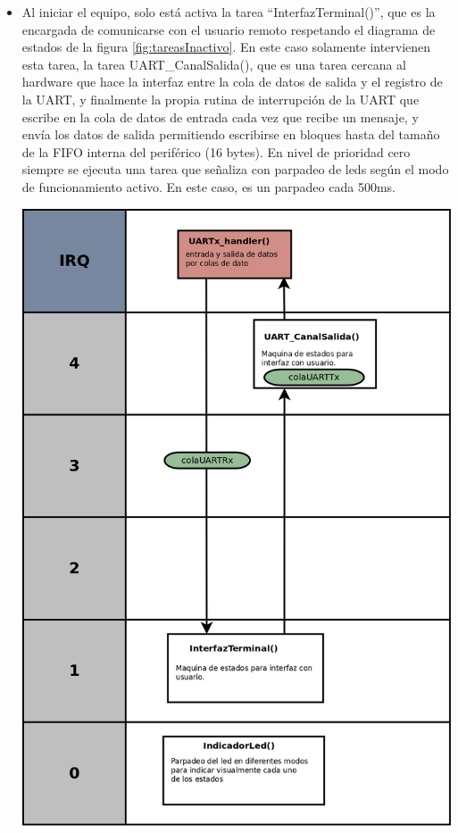 \begin{itemize}

	\item Al iniciar el equipo, solo está activa la tarea “InterfazTerminal()”, que es la encargada de comunicarse con el usuario remoto respetando el diagrama de estados de la figura \ref{fig:tareasInactivo}. En este caso solamente intervienen esta tarea, la tarea UART\_CanalSalida(), que es una tarea cercana al hardware que hace la interfaz entre la cola de datos de salida y el registro de la UART, y finalmente la propia rutina de interrupción de la UART que escribe en la cola de datos de entrada cada vez que recibe un mensaje, y envía los datos de salida permitiendo escribirse en bloques hasta del tamaño de la FIFO interna del periférico (16 bytes). En nivel de prioridad cero siempre se ejecuta una tarea que señaliza con parpadeo de leds según el modo de funcionamiento activo. En este caso, es un parpadeo cada 500ms.

\begin{adjustbox}{center,caption={Diagrama de tareas en modo inactivo},label={fig:tareasInactivo},nofloat=figure,vspace=\bigskipamount}
\includegraphics[scale = 0.17]{./Figures/tareasInactivo.png}
\end{adjustbox}


\end{itemize}
